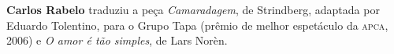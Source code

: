 \textbf{Carlos Rabelo} traduziu a peça \textit{Camaradagem}, de Strindberg, adaptada por Eduardo Tolentino, 
para o Grupo Tapa (prêmio de melhor espetáculo da \textsc{apca}, 2006) e \textit{O amor é tão simples}, de Lars Norèn.




